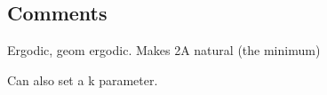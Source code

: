 \subsection{Comments}
Ergodic, geom ergodic.
Makes 2A natural (the minimum)

Can also set a k parameter.
